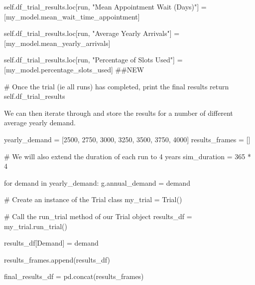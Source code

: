 \documentclass[
  letterpaper,
  DIV=11,
  numbers=noendperiod]{scrreprt}
\newenvironment{Shaded}{\begin{snugshade}}{\end{snugshade}}
\newcommand{\CommentTok}[1]{\textcolor[rgb]{0.37,0.37,0.37}{#1}}
\newcommand{\ControlFlowTok}[1]{\textcolor[rgb]{0.00,0.23,0.31}{#1}}
\newcommand{\DecValTok}[1]{\textcolor[rgb]{0.68,0.00,0.00}{#1}}
\newcommand{\KeywordTok}[1]{\textcolor[rgb]{0.00,0.23,0.31}{#1}}
\newcommand{\NormalTok}[1]{\textcolor[rgb]{0.00,0.23,0.31}{#1}}
\newcommand{\OperatorTok}[1]{\textcolor[rgb]{0.37,0.37,0.37}{#1}}
\newcommand{\StringTok}[1]{\textcolor[rgb]{0.13,0.47,0.30}{#1}}
\newcommand{\VariableTok}[1]{\textcolor[rgb]{0.07,0.07,0.07}{#1}}
\begin{document}
\begin{Shaded}
\begin{Highlighting}[]
            \VariableTok{self}\NormalTok{.df\_trial\_results.loc[run, }\StringTok{"Mean Appointment Wait (Days)"}\NormalTok{] }\OperatorTok{=}\NormalTok{ [my\_model.mean\_wait\_time\_appointment]}

            \VariableTok{self}\NormalTok{.df\_trial\_results.loc[run, }\StringTok{"Average Yearly Arrivals"}\NormalTok{] }\OperatorTok{=}\NormalTok{ [my\_model.mean\_yearly\_arrivals]}

            \VariableTok{self}\NormalTok{.df\_trial\_results.loc[run, }\StringTok{"Percentage of Slots Used"}\NormalTok{] }\OperatorTok{=}\NormalTok{ [my\_model.percentage\_slots\_used] }\CommentTok{\#\#NEW}

        \CommentTok{\# Once the trial (ie all runs) has completed, print the final results}
        \ControlFlowTok{return} \VariableTok{self}\NormalTok{.df\_trial\_results}
\end{Highlighting}
\end{Shaded}

We can then iterate through and store the results for a number of
different average yearly demand.

\begin{Shaded}
\begin{Highlighting}[]
\NormalTok{yearly\_demand }\OperatorTok{=}\NormalTok{ [}\DecValTok{2500}\NormalTok{, }\DecValTok{2750}\NormalTok{, }\DecValTok{3000}\NormalTok{, }\DecValTok{3250}\NormalTok{, }\DecValTok{3500}\NormalTok{, }\DecValTok{3750}\NormalTok{, }\DecValTok{4000}\NormalTok{]}
\NormalTok{results\_frames }\OperatorTok{=}\NormalTok{ []}

\CommentTok{\# We will also extend the duration of each run to 4 years}
\NormalTok{sim\_duration }\OperatorTok{=} \DecValTok{365} \OperatorTok{*} \DecValTok{4}

\ControlFlowTok{for}\NormalTok{ demand }\KeywordTok{in}\NormalTok{ yearly\_demand:}
\NormalTok{    g.annual\_demand }\OperatorTok{=}\NormalTok{ demand}

    \CommentTok{\# Create an instance of the Trial class}
\NormalTok{    my\_trial }\OperatorTok{=}\NormalTok{ Trial()}

    \CommentTok{\# Call the run\_trial method of our Trial object}
\NormalTok{    results\_df }\OperatorTok{=}\NormalTok{ my\_trial.run\_trial()}

\NormalTok{    results\_df[}\StringTok{\textquotesingle{}Demand\textquotesingle{}}\NormalTok{] }\OperatorTok{=}\NormalTok{ demand}

\NormalTok{    results\_frames.append(results\_df)}

\NormalTok{final\_results\_df }\OperatorTok{=}\NormalTok{ pd.concat(results\_frames)}
\end{Highlighting}
\end{Shaded}
\end{document}
